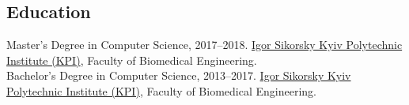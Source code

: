\documentclass{article}
\begin{document}

\subsection*{Education}

\begin{samepage}
Master's Degree in Computer Science, 2017--2018.
\newline \href{https://kpi.ua/en}{Igor Sikorsky Kyiv Polytechnic Institute (KPI)}, Faculty of Biomedical Engineering.
\\[8px] Bachelor's Degree in Computer Science, 2013--2017.
\newline \href{https://kpi.ua/en}{Igor Sikorsky Kyiv Polytechnic Institute (KPI)}, Faculty of Biomedical Engineering.
\end{samepage}
\end{document}
